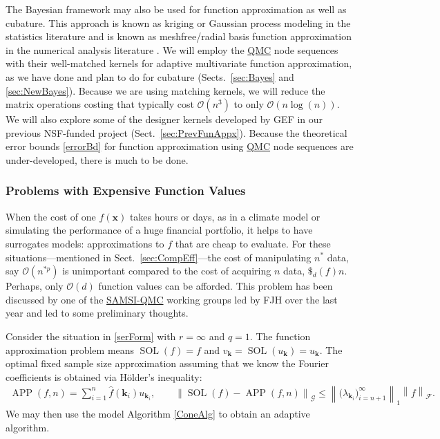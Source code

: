 \documentclass[11pt]{NSFamsart}
\newcommand{\QMC}{\hyperlink{QMClink}{QMC}\xspace}
\newcommand{\SAMSIQMC}{\hyperlink{SAMSIlink}{SAMSI-QMC}\xspace}
\newcommand{\hf}{\widehat{f}}
\DeclareMathOperator{\SOL}{SOL}
\DeclareMathOperator{\APP}{APP}
\newcommand{\bx}{{\boldsymbol{x}}}
\newcommand{\bk}{{\boldsymbol{k}}}
\newcommand{\calf}{{\mathcal{F}}}
\newcommand{\calg}{{\mathcal{G}}}
\newcommand{\norm}[2][{}]{\ensuremath{\left \lVert #2 \right \rVert}_{#1}}
\newcommand{\bignorm}[2][{}]{\ensuremath{\bigl \lVert #2 \bigr \rVert}_{#1}}
\newcommand{\Order}{\mathcal{O}}
\begin{document}
The Bayesian framework may also be used for function approximation as well as cubature.  This approach is known as kriging or Gaussian process modeling in the statistics literature \cite{RasWil06a,Ste99} and is known as meshfree/radial basis function 
approximation in the numerical analysis literature \cite{Fas07a,FasMcC15a,Wen05a}.  We will employ the \QMC node sequences with their well-matched kernels for adaptive multivariate function 
approximation, as we have done and plan to do for cubature (Sects.\ \ref{sec:Bayes} and \ref{sec:NewBayes}).  Because we are using matching kernels, we will reduce the matrix operations costing that typically cost $\Order(n^3)$ to only $\Order(n \log(n))$.  We will also explore some of the designer kernels developed by GEF in our previous NSF-funded  project (Sect.\ \ref{sec:PrevFunAppx}).  Because the theoretical error bounds \eqref{errorBd} for function approximation using \QMC node sequences are under-developed, there is much to be done.

\subsubsection{Problems with Expensive Function Values} 
\label{sec:Expensive}

When the cost of one $f(\bx)$ takes hours or days, as in a climate model or simulating the performance of a huge financial portfolio, it helps to have surrogates models: approximations to $f$ that are cheap to evaluate.  For these situations---mentioned in Sect.\ \ref{sec:CompEff}---the cost of manipulating $n^*$ data, say $\Order(n^{*p})$ is unimportant compared to the cost of acquiring $n$ data, $\$_d(f)n$.  Perhaps, only $\Order(d)$ function values can be afforded.  This problem has been discussed by one of the \SAMSIQMC working groups led by FJH over the last year and led to some preliminary thoughts.  

Consider the situation in \eqref{serForm} with $r = \infty$ and $q=1$.  The function approximation problem means $\SOL(f) = f$ and $v_{\bk} = \SOL(u_{\bk}) = u_{\bk}$.  The optimal fixed sample size approximation assuming that we know the Fourier coefficients is obtained via H\"older's inequality:
\begin{gather*}
    \APP(f,n) = \sum_{i=1}^n \hf(\bk_i) u_{\bk_i}, \qquad
    \norm[\calg]{\SOL(f) - \APP(f,n)} %
    \le \norm[1] {\bigl(\lambda_{\bk_i}\bigr)_{i=n+1}^\infty } \norm[\calf]{f}.
\end{gather*}
We may then use the model Algorithm \ref{ConeAlg} to obtain an adaptive algorithm.  
\end{document}
